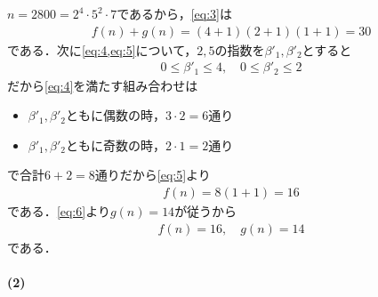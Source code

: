 \documentclass[../../main.tex]{subfiles}
\begin{document}
$n=2800=2^4\cdot5^2\cdot7$であるから，\cref{eq:3}は
\begin{align}
  f(n) + g(n) = (4+1)(2+1)(1+1) = 30 \label{eq:6}
\end{align}
である．次に\cref{eq:4,eq:5}について，$2,5$の指数を$\beta'_1,\beta'_2$とすると
\begin{align}
  0 \le \beta'_1 \le 4,
  \quad
  0 \le \beta'_2 \le 2
\end{align}
だから\cref{eq:4}を満たす組み合わせは
\begin{itemize}
  \item $\beta'_1,\beta'_2$ともに偶数の時，$3\cdot2=6$通り
  \item $\beta'_1,\beta'_2$ともに奇数の時，$2\cdot1=2$通り
\end{itemize}
で合計$6+2=8$通りだから\cref{eq:5}より
\begin{align}
  f(n) = 8(1+1) = 16
\end{align}
である．\cref{eq:6}より$g(n)=14$が従うから
\begin{align}
  f(n) = 16,
  \quad
  g(n) = 14
\end{align}
である．

\paragraph{(2)}
\end{document}
